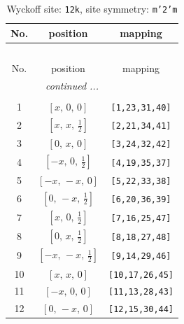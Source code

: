 \documentclass[fleqn,8pt]{jsarticle}
\begin{document}
\begin{longtable}{ccc}
\caption{Wyckoff site: {\tt 12k}, site symmetry: {\tt m'2'm}}
 \\
 \hline \hline
No. & position & mapping \\ \hline \endfirsthead

\multicolumn{2}{l}{\tablename\ \thetable{}} \\
 \hline \hline
No. & position & mapping \\ \hline \endhead

 \hline \hline
\multicolumn{2}{r}{\footnotesize\it continued ...} \\ \endfoot

 \hline \hline
\multicolumn{2}{r}{} \\ \endlastfoot

1 & $\left[ x,\, 0,\, 0 \right]$ & {\tt [1,23,31,40]} \\ \hline
2 & $\left[ x,\, x,\, \frac{1}{2} \right]$ & {\tt [2,21,34,41]} \\ \hline
3 & $\left[ 0,\, x,\, 0 \right]$ & {\tt [3,24,32,42]} \\ \hline
4 & $\left[ - x,\, 0,\, \frac{1}{2} \right]$ & {\tt [4,19,35,37]} \\ \hline
5 & $\left[ - x,\, - x,\, 0 \right]$ & {\tt [5,22,33,38]} \\ \hline
6 & $\left[ 0,\, - x,\, \frac{1}{2} \right]$ & {\tt [6,20,36,39]} \\ \hline
7 & $\left[ x,\, 0,\, \frac{1}{2} \right]$ & {\tt [7,16,25,47]} \\ \hline
8 & $\left[ 0,\, x,\, \frac{1}{2} \right]$ & {\tt [8,18,27,48]} \\ \hline
9 & $\left[ - x,\, - x,\, \frac{1}{2} \right]$ & {\tt [9,14,29,46]} \\ \hline
10 & $\left[ x,\, x,\, 0 \right]$ & {\tt [10,17,26,45]} \\ \hline
11 & $\left[ - x,\, 0,\, 0 \right]$ & {\tt [11,13,28,43]} \\ \hline
12 & $\left[ 0,\, - x,\, 0 \right]$ & {\tt [12,15,30,44]} \\
\end{longtable}
\renewcommand{\arraystretch}{1.2}
\end{document}
